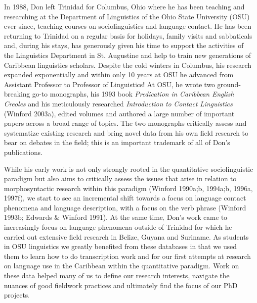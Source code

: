 \documentclass[output=paper, colorlinks,citecolor=brown]{langscibook}
\begin{document}
In 1988, Don left Trinidad for Columbus, Ohio where he has been teaching and researching at the Department of Linguistics of the Ohio State University (OSU) ever since, teaching courses on sociolinguistics and language contact. He has been returning to Trinidad on a regular basis for holidays, family visits and sabbaticals and, during his stays, has generously given his time to support the activities of the Linguistics Department in St. Augustine and help to train new generations of Caribbean linguistics scholars. Despite the cold winters in Columbus, his research expanded exponentially and within only 10 years at OSU he advanced from Assistant Professor to Professor of Linguistics! At OSU, he wrote two ground-breaking go-to monographs, his 1993 book \textit{Predication in Caribbean English Creoles} and his meticulously researched \textit{Introduction to Contact Linguistics} (Winford 2003a), edited volumes and authored a large number of important papers across a broad range of topics. The two monographs critically assess and systematize existing research and bring novel data from his own field research to bear on debates in the field; this is an important trademark of all of Don’s publications. 

While his early work is not only strongly rooted in the quantitative sociolinguistic paradigm but also aims to critically assess the issues that arise in relation to morphosyntactic research within this paradigm (Winford 1990a;b, 1994a;b, 1996a, 1997f), we start to see an incremental shift towards a focus on language contact phenomena and language description, with a focus on the verb phrase (Winford 1993b; Edwards \& Winford 1991). At the same time, Don’s work came to increasingly focus on language phenomena outside of Trinidad for which he carried out extensive field research in Belize, Guyana and Suriname. As students in OSU linguistics we greatly benefited from these databases in that we used them to learn how to do transcription work and for our first attempts at research on language use in the Caribbean within the quantitative paradigm. Work on these data helped many of us to define our research interests, navigate the nuances of good fieldwork practices and ultimately find the focus of our PhD projects.
\end{document}
